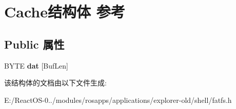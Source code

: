 \hypertarget{struct_cache}{}\section{Cache结构体 参考}
\label{struct_cache}
\subsection*{Public 属性}
\begin{DoxyCompactItemize}
\item 
\mbox{\label{struct_cache_a23ed8e0b4125a3553681a3f8cd9a1a90}} 
B\+Y\+TE {\bfseries dat} \mbox{[}Buf\+Len\mbox{]}
\end{DoxyCompactItemize}


该结构体的文档由以下文件生成\+:\begin{DoxyCompactItemize}
\item 
E\+:/\+React\+O\+S-\/0../modules/rosapps/applications/explorer-\/old/shell/fatfs.\+h\end{DoxyCompactItemize}

